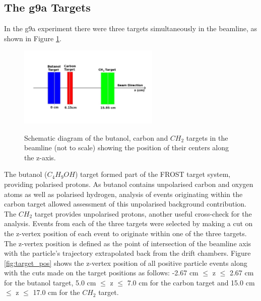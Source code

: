 \subsection{The g9a Targets}
In the g9a experiment there were three targets simultaneously in the beamline, as shown in Figure \ref{fig:target_draw}.
\begin{figure}[htb]
  \begin{center}
    \includegraphics[width=0.6\textwidth]{figures/targets_drawing.png} \\
    \caption{Schematic diagram of the butanol, carbon and $CH_2$ targets in the beamline (not to scale) showing the position of their centers along the z-axis. }
    \label{fig:target_draw}
    \end{center}
  \end{figure}
The butanol ($C_4 H_9OH$) target formed part of the FROST target system,  providing polarised protons. As butanol contains unpolarised carbon and oxygen atoms as well as polarised hydrogen, analysis of events originating within the carbon target allowed assessment of this unpolarised background contribution. The $CH_2$ target provides unpolarised protons, another useful cross-check for the analysis. Events from each of the three targets were selected by making a cut on the z-vertex position of each event to originate within one of the three targets. The z-vertex position is defined as the point of intersection of the beamline axis with the particle’s trajectory extrapolated back from the drift chambers. Figure \ref{fig:target_pos} shows the z-vertex position of all positive particle events along with the cuts made on the target positions as follows: -2.67 cm $\leq$ z $\leq$ 2.67 cm for the butanol target, 5.0 cm $\leq$ z $\leq$ 7.0 cm for the carbon target and 15.0 cm $\leq$ z $\leq$ 17.0 cm for the $CH_2$ target.
